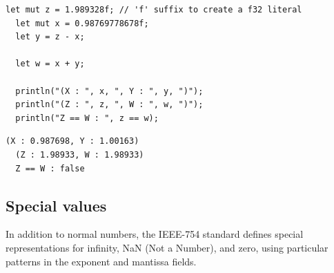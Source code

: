 \begin{lstlisting}[style=coloredverbatim, label=lst:(chap2):stepping_example, caption=Example of floating point stepping]
  let mut z = 1.989328f; // 'f' suffix to create a f32 literal
  let mut x = 0.98769778678f;
  let y = z - x;

  let w = x + y;

  println("(X : ", x, ", Y : ", y, ")");
  println("(Z : ", z, ", W : ", w, ")");
  println("Z == W : ", z == w);
\end{lstlisting}
\vspace{-10pt}%
\begin{lstlisting}[style=bashVerb]
  (X : 0.987698, Y : 1.00163)
  (Z : 1.98933, W : 1.98933)
  Z == W : false
\end{lstlisting}


\subsection{Special values}

In addition to normal numbers, the IEEE-754 standard defines special
representations for infinity, NaN (Not a Number), and zero, using particular
patterns in the exponent and mantissa fields.


